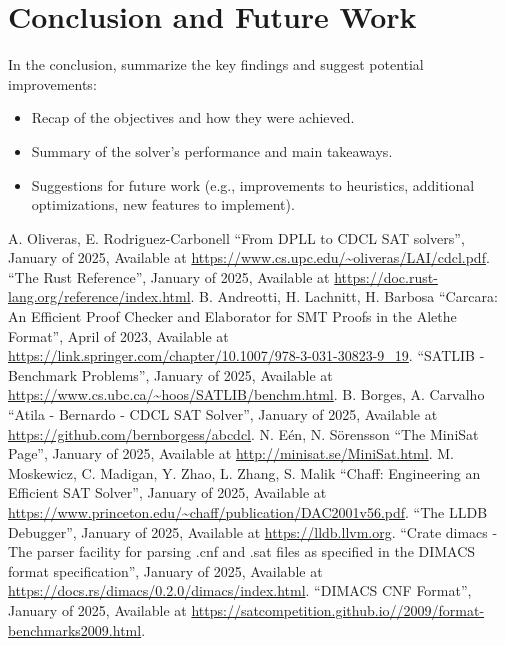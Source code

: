 \documentclass[a4paper,12pt]{article}
\begin{document}

\section{Conclusion and Future Work}
\label{sec:conclusion}
In the conclusion, summarize the key findings and suggest potential improvements:
\begin{itemize}
    \item Recap of the objectives and how they were achieved.
    \item Summary of the solver’s performance and main takeaways.
    \item Suggestions for future work (e.g., improvements to heuristics, additional optimizations, new features to implement).
\end{itemize}

\begin{thebibliography}{00}
             A. Oliveras, E. Rodriguez-Carbonell ``From DPLL to CDCL SAT solvers'', January of 2025, Available at \url{https://www.cs.upc.edu/~oliveras/LAI/cdcl.pdf}.
                  ``The Rust Reference'', January of 2025, Available at \url{https://doc.rust-lang.org/reference/index.html}.
                   B. Andreotti, H. Lachnitt, H. Barbosa ``Carcara: An Efficient Proof Checker and Elaborator for SMT Proofs in the Alethe Format'', April of 2023, Available at \url{https://link.springer.com/chapter/10.1007/978-3-031-30823-9\_19}.
             ``SATLIB - Benchmark Problems'', January of 2025, Available at \url{https://www.cs.ubc.ca/~hoos/SATLIB/benchm.html}.
              B. Borges, A. Carvalho ``Atila - Bernardo - CDCL SAT Solver'', January of 2025, Available at \url{https://github.com/bernborgess/abcdcl}.
                   N. Eén, N. Sörensson ``The MiniSat Page'', January of 2025, Available at \url{http://minisat.se/MiniSat.html}.
                     M. Moskewicz, C. Madigan, Y. Zhao, L. Zhang, S. Malik ``Chaff: Engineering an Efficient SAT Solver'', January of 2025, Available at \url{https://www.princeton.edu/~chaff/publication/DAC2001v56.pdf}.
                      ``The LLDB Debugger'', January of 2025, Available at \url{https://lldb.llvm.org}.
               ``Crate dimacs - The parser facility for parsing .cnf and .sat files as specified in the DIMACS format specification'', January of 2025, Available at \url{https://docs.rs/dimacs/0.2.0/dimacs/index.html}.
              ``DIMACS CNF Format'', January of 2025, Available at \url{https://satcompetition.github.io//2009/format-benchmarks2009.html}.
\end{thebibliography}
\end{document}
